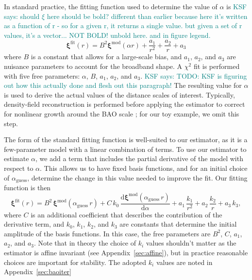 \documentclass[modern]{aastex62}
\newcommand{\dd}{\mathrm{d}}
\newcommand{\bld}[1]{\bm{#1}} %
\newcommand{\KSF}[1]{\textcolor{teal}{KSF says: #1}}
\begin{document}
In standard practice, the fitting function used to determine the value of $\alpha$ is 
\KSF{should $\xi$ here should be bold? different than earlier because here it's written as a function of r - so for a given r, it returns a single value. but given a set of r values, it's a vector... NOT BOLD! unbold here. and in figure legend.}
\begin{equation}
\bld{\xi}^{\mathrm{fit}}(r) = B^2 \bld{\xi}^{\mathrm{mod}}(\alpha r) + \frac{a_1}{r^2} + \frac{a_2}{r} + a_3
\end{equation}
where $B$ is a constant that allows for a large-scale bias, and $a_1$, $a_2$, and $a_3$ are nuisance parameters to account for the broadband shape.
A $\chi^2$ fit is performed with five free parameters: $\alpha$, $B$, $a_1$, $a_2$, and $a_3$. 
\KSF{TODO: KSF is figuring out how this actually done and flesh out this paragraph!}
The resulting value for $\alpha$ is used to derive the actual values of the distance scales of interest.
Typically, density-field reconstruction is performed before applying the estimator to correct for nonlinear growth around the BAO scale \citep{Eisenstein2007}; for our toy example, we omit this step.

The form of the standard fitting function is well-suited to our estimator, as it is a few-parameter model with a linear combination of terms.
To use our estimator to estimate $\alpha$, we add a term that includes the partial derivative of the model with respect to $\alpha$.
This allows us to have fixed basis functions, and for an initial choice of $\alpha_\mathrm{guess}$, determine the change in this value needed to improve the fit. 
Our fitting function is then
\begin{equation} \label{eq:baoiter_fit}
\bld{\xi}^\mathrm{fit}(r) = B^2\,\bld{\xi}^\mathrm{mod}(\alpha_\mathrm{guess}\,r) + C\,k_0\,\frac{\dd \bld{\xi}^\mathrm{mod}(\alpha_\mathrm{guess}\,r)}{\dd \alpha} + a_1\,\frac{k_1}{r^2} + a_2\,\frac{k_2}{r} + a_3\,k_3 ,
\end{equation}
where $C$ is an additional coefficient that describes the contribution of the derivative term, and $k_0$, $k_1$, $k_2$, and $k_3$ are constants that determine the initial amplitude of the basis functions.
In this case, the free parameters are $B^2$, $C$, $a_1$, $a_2$, and $a_3$.
Note that in theory the choice of $k_i$ values shouldn't matter as the estimator is affine invariant (see Appendix~\ref{sec:affine}), but in practice reasonable choices are important for stability.
The adopted $k_i$ values are noted in Appendix~\ref{sec:baoiter}
\end{document}
